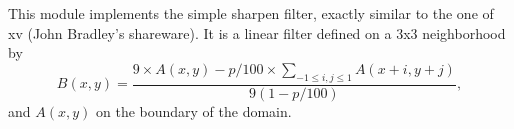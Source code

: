 This module implements the simple sharpen filter, 
exactly similar to the one of xv (John Bradley's shareware). It is a linear filter
defined on a 3x3 neighborhood by
$$ B(x,y) = 
\frac{\displaystyle 9 \times A(x,y) - p/100 \times \sum_{-1\leq i,j\leq 1}A(x+i,y+j)}{9(1-p/100)},$$
and $A(x,y)$ on the boundary of the domain.


